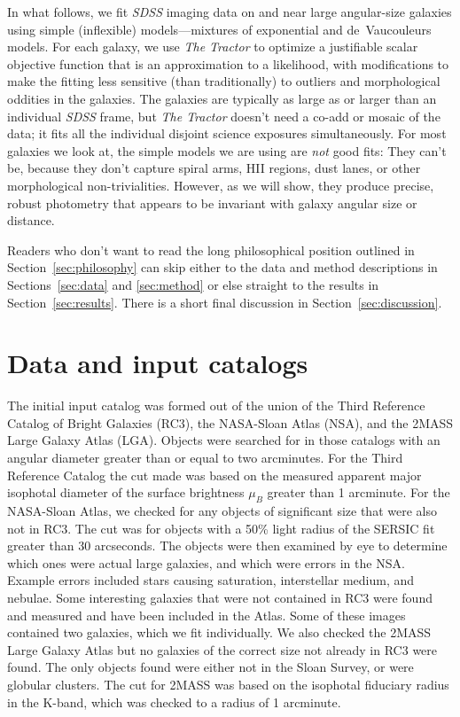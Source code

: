 \documentclass[12pt,preprint,pdftex]{aastex}
\newcommand{\project}[1]{\textsl{#1}}
\newcommand{\sectionname}{Section}
\newcommand{\sectionnames}{\sectionname s}
\begin{document}
In what follows, we fit \project{SDSS} imaging
data on and near large angular-size galaxies using simple (inflexible)
models---mixtures of exponential and de~Vaucouleurs models.  For each
galaxy, we use \project{The Tractor} to
optimize a justifiable scalar objective function that is an
approximation to a likelihood, with modifications to make the fitting
less sensitive (than traditionally) to outliers and morphological
oddities in the galaxies.  The galaxies are typically as large as or
larger than an individual \project{SDSS} frame, but \project{The
  Tractor} doesn't need a co-add or mosaic of the data; it fits all
the individual disjoint science exposures simultaneously.  For most
galaxies we look at, the simple models we are using are \emph{not}
good fits: They can't be, because they don't capture spiral arms, HII
regions, dust lanes, or other morphological non-trivialities.
However, as we will show, they produce precise, robust photometry that
appears to be invariant with galaxy angular size or distance.

Readers who don't want to read the long philosophical position
outlined in \sectionname~\ref{sec:philosophy} can skip either to the
data and method descriptions in \sectionnames~\ref{sec:data} and
\ref{sec:method} or else straight to the results in
\sectionname~\ref{sec:results}.  There is a short final discussion in
\sectionname~\ref{sec:discussion}.

\section{Data and input catalogs}


The initial input catalog was formed out of the union of the Third Reference Catalog of Bright Galaxies (RC3), the NASA-Sloan Atlas (NSA), and the 2MASS Large Galaxy Atlas (LGA). Objects were searched for in those catalogs with an angular diameter greater than or equal to two arcminutes. For the Third Reference Catalog the cut made was based on the measured apparent major isophotal diameter of the surface brightness $\mu_{B}$ greater than 1 arcminute. For the NASA-Sloan Atlas, we checked for any objects of significant size that were
also not in RC3. The cut was for objects with a 50\% light radius of
the SERSIC fit greater than 30 arcseconds. The objects were then
examined by eye to determine which ones were actual large galaxies,
and which were errors in the NSA. Example errors included stars
causing saturation, interstellar medium, and nebulae. Some interesting galaxies that were not contained in RC3 were found and measured and have been included in the Atlas. Some of these images contained two galaxies, which we fit individually. We also checked
the 2MASS Large Galaxy Atlas but no galaxies of the correct size not
already in RC3 were found. The only objects found were either not in
the Sloan Survey, or were globular clusters. The cut for 2MASS was
based on the isophotal fiduciary radius in the K-band, which was
checked to a radius of 1 arcminute.
\end{document}
